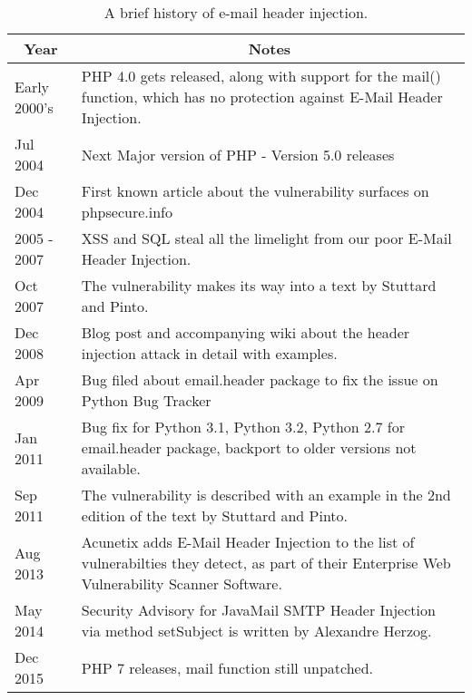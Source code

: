 \begin{table}[!htbp]
	\centering
	\begin{tabular}{|p{2cm}|p{12cm}|}
		\hline
		\multicolumn{1}{|c|}{\textbf{Year}} & \multicolumn{1}{c|}{\textbf{ Notes}}\\
		\hline

		{Early 2000's } & { PHP 4.0 gets released, along with support for the mail() function, which has no protection against E-Mail Header Injection.}\\
		\hline

		{Jul 2004} & { Next Major version of PHP - Version 5.0 releases}\\
		\hline

		{Dec 2004} & { First known article about the vulnerability surfaces on phpsecure.info}\\
		\hline

		{2005 - 2007} & {XSS and SQL steal all the limelight from our poor E-Mail Header Injection.}\\
		\hline

		{Oct 2007} & {The vulnerability makes its way into a text by Stuttard and Pinto. }\\
		\hline

		{Dec 2008} & {Blog post and accompanying wiki about the header injection attack in detail with examples.}\\
		\hline

		{Apr 2009} & {Bug filed about email.header package to fix the issue on Python Bug Tracker}\\
		\hline

		{Jan 2011} & {Bug fix for Python 3.1, Python 3.2, Python 2.7 for email.header package, backport to older versions not available.}\\
		\hline

		{Sep 2011} & {The vulnerability is described with an example in the 2nd edition of the text by Stuttard and Pinto.}\\
		\hline

		{Aug 2013} & {Acunetix adds E-Mail Header Injection to the list of vulnerabilties they detect, as part of their Enterprise Web Vulnerability Scanner Software.}\\
		\hline

		{May 2014} & {Security Advisory for JavaMail SMTP Header Injection via method setSubject is written by Alexandre Herzog.}\\
		\hline

		{Dec 2015}  & {PHP 7 releases, mail function still unpatched.}\\
		\hline
	\end{tabular}
	\caption[A brief history of e-mail header injection]{A brief history of e-mail header injection.}
	\label{tab:history}
\end{table}
